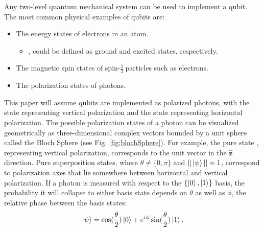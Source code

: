 \documentclass[conference]{IEEEtran}
\begin{document}
Any two-level quantum mechanical system can be used to implement a qubit. The most common physical examples of qubits are:
\begin{itemize}
\item The energy states of electrons in an atom.
  \begin{itemize}
  \item {},  could be defined as ground and excited states, respectively.
  \end{itemize}
\item The magnetic spin states of spin-\( \frac{1}{2}\ \)particles such as electrons.
\item The polarization states of photons.
\end{itemize}
This paper will assume qubits are implemented as polarized photons, with the state  representing vertical polarization and the state  representing horizontal polarization. The possible polarization states of a photon can be visualized geometrically as three-dimensional complex vectors bounded by a unit sphere called the Bloch Sphere (see Fig. \ref{fig:blochSphere}). For example, the pure state , representing vertical polarization, corresponds to the unit vector in the $\hat{\textbf{z}}$ direction. Pure superposition states, where $\theta \neq \{0, \pi\}$ and $||\left\vert{\psi}\right\rangle|| = 1$, correspond to polarization axes that lie somewhere between horizontal and vertical polarization. If a photon is measured with respect to the $\{\left\vert{0}\right\rangle, \left\vert{1}\right\rangle\}$ basis, the probability it will collapse to either basis state depends on $\theta$ as well as $\phi$, the relative phase between the basis states: \[ \left\vert{\psi}\right\rangle = \cos(\frac{\theta}{2})\left\vert{0}\right\rangle + e^{{i\mkern1mu}\phi}\sin(\frac{\theta}{2})\left\vert{1}\right\rangle. \]\\
\end{document}
